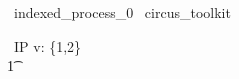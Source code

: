 
\begin{zsection}
  \SECTION\ indexed\_process\_0 \parents\ circus\_toolkit
\end{zsection}

\begin{circus}
    \circprocess\ IP \circdef  v: \{1,2\} \circindex \circbegin  \\
        \t1 \circspot \Skip \\
    \circend
\end{circus}
